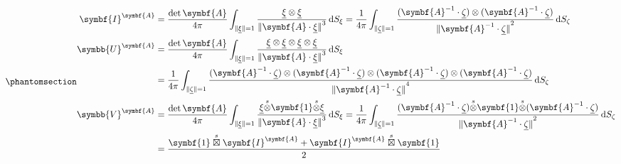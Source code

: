 \documentclass[
  a4paper,
  numbers=noendperiod,
  DIV=12]{scrreprt}
\newcommand{\uu}[1]{{\symbf{{#1}}}}
\newcommand{\uuuu}[1]{{\symbb{{#1}}}}
\newcommand{\uv}[1]{{\underline{{#1}}}}
\newcommand{\sotimes}{{\stackrel{s}{\otimes}}}
\newcommand{\sboxtimes}{\stackrel{s}{\boxtimes}}
\newcommand{\norm}[1]{{\lVert{{#1}}\rVert}}
\newcommand{\ud}{{\,\mathrm{d}}}
\begin{document}
\begin{equation}\protect\phantomsection\label{eq-tensIUV}{\begin{align}
\uu{I}^{\uu{A}} &= \frac{\det{\uu{A}}}{4\pi}
\int_{\norm{\uv{\xi}}=1}
\frac{\uv{\xi}\otimes\uv{\xi}}
{\norm{\uu{A}\cdot\uv{\xi}}^3}\ud S_{\xi}
=
\frac{1}{4\pi}
\int_{\norm{\uv{\zeta}}=1}
\frac{%
(\uu{A}^{-1}\cdot\uv{\zeta})
\otimes
(\uu{A}^{-1}\cdot\uv{\zeta})
}{\norm{\uu{A}^{-1}\cdot\uv{\zeta}}^2}
\ud S_{\zeta}
\\
\uuuu{U}^{\uu{A}} &= \frac{\det{\uu{A}}}{4\pi}
\int_{\norm{\uv{\xi}}=1}
\frac{\uv{\xi}\otimes\uv{\xi}\otimes\uv{\xi}\otimes\uv{\xi}}
{\norm{\uu{A}\cdot\uv{\xi}}^3}\ud S_{\xi}\\
&=
\frac{1}{4\pi}
\int_{\norm{\uv{\zeta}}=1}
\frac{%
(\uu{A}^{-1}\cdot\uv{\zeta})
\otimes
(\uu{A}^{-1}\cdot\uv{\zeta})
\otimes
(\uu{A}^{-1}\cdot\uv{\zeta})
\otimes
(\uu{A}^{-1}\cdot\uv{\zeta})
}{\norm{\uu{A}^{-1}\cdot\uv{\zeta}}^4}
\ud S_{\zeta}
\\
\uuuu{V}^{\uu{A}} &= \frac{\det{\uu{A}}}{4\pi}
\int_{\norm{\uv{\xi}}=1}
\frac{\uv{\xi}\sotimes\uu{1}\sotimes\uv{\xi}}
{\norm{\uu{A}\cdot\uv{\xi}}^3}\ud S_{\xi}
=
\frac{1}{4\pi}
\int_{\norm{\uv{\zeta}}=1}
\frac{%
(\uu{A}^{-1}\cdot\uv{\zeta})
\sotimes
\uu{1}
\sotimes
(\uu{A}^{-1}\cdot\uv{\zeta})
}{\norm{\uu{A}^{-1}\cdot\uv{\zeta}}^2}
\ud S_{\zeta}\\
&=
\frac{\uu{1}\sboxtimes\uu{I}^{\uu{A}}+\uu{I}^{\uu{A}}\sboxtimes\uu{1}}{2}
\end{align}}\end{equation}
\end{document}
